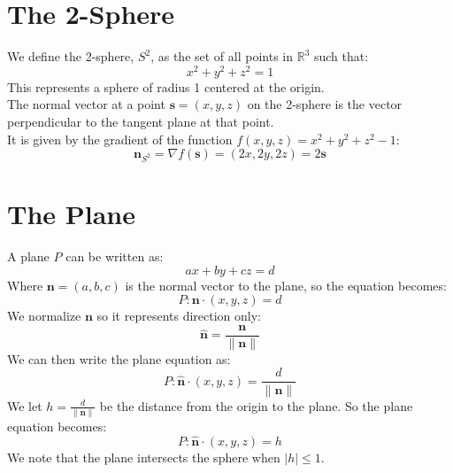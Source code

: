 \documentclass[11pt]{article}
\begin{document}
\newpage

\section*{The 2-Sphere}
We define the 2-sphere, $S^2$, as the set of all points in $\mathbb{R}^3$ such that:
$$x^2 + y^2 + z^2 = 1$$
This represents a sphere of radius 1 centered at the origin. \\
The normal vector at a point $\mathbf{s} = (x, y, z)$ on the 2-sphere is the vector perpendicular to the tangent plane at that point. \\
It is given by the gradient of the function $f(x,y,z) = x^2 + y^2 + z^2 - 1$:
$$\mathbf{n}_{S^2} = \nabla f(\mathbf{s}) = (2x, 2y, 2z) = 2\textbf{s}$$
\section*{The Plane}
A plane $P$ can be written as:
$$ax + by + cz = d$$
Where $\textbf{n} = (a,b,c)$ is the normal vector to the plane, so the equation becomes:
$$P : \textbf{n} \cdot (x,y,z) = d$$
We normalize $\textbf{n}$ so it represents direction only:
$$\hat{\textbf{n}} = \frac{\textbf{n}}{\|\textbf{n}\|}$$
We can then write the plane equation as:
$$P : \hat{\textbf{n}} \cdot (x,y,z) = \frac{d}{\|\textbf{n}\|}$$
We let $h = \frac{d}{\|\textbf{n}\|}$ be the distance from the origin to the plane.
So the plane equation becomes:
$$P : \hat{\textbf{n}} \cdot (x,y,z) = h$$
We note that the plane intersects the sphere when $|h| \leq 1$.
\end{document}
